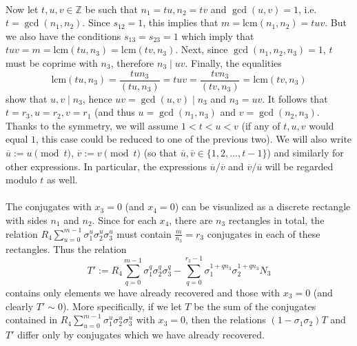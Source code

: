 \documentclass[12pt,a4paper]{article}
\newcommand{\Z}{\mathbb{Z}}
\newcommand{\uo}{\overline{u}}
\newcommand{\vo}{\overline{v}}
\newcommand{\lcm}{\mathrm{lcm}}
\begin{document}
\paragraph*{}
Now let $t,u,v\in\Z$ be such that $n_1=tu,n_2=tv$ and $\gcd(u,v)=1$, i.e. $t=\gcd(n_1,n_2)$. Since $s_{12}=1$, this implies that $m=\lcm(n_1,n_2)=tuv$. But we also have the conditions $s_{13}=s_{23}=1$ which imply that $tuv=m=\lcm(tu,n_3)=\lcm(tv,n_3)$. Next, since $\gcd(n_1,n_2,n_3)=1$, $t$ must be coprime with $n_3$, therefore $n_3\mid uv$. Finally, the equalities $$\lcm(tu,n_3)=\frac{tun_3}{(tu,n_3)}=tuv=\frac{tvn_3}{(tv,n_3)}=\lcm(tv,n_3)$$
show that $u,v\mid n_3$, hence $uv=\gcd(u,v)\mid n_3$ and $n_3=uv$. It follows that $t=r_3,u=r_2,v=r_1$ (and thus $u=\gcd(n_1,n_3)$ and $v=\gcd(n_2,n_3)$. Thanks to the symmetry, we will assume $1<t<u<v$ (if any of $t,u,v$ would equal $1$, this case could be reduced to one of the previous two). We will also write $\uo:=u\pmod{t}$, $\vo:=v\pmod{t}$ (so that $\uo,\vo\in\{1,2,\dots,t-1\}$) and similarly for other expressions. In particular, the expressions $\uo/\vo$ and $\vo/\uo$ will be regarded modulo $t$ as well.
\paragraph*{}
The conjugates with $x_3=0$ (and $x_4=0$) can be visualized as a discrete rectangle with sides $n_1$ and $n_2$. Since for each $x_4$, there are $n_3$ rectangles in total, the relation $R_4\sum_{u=0}^{m-1}\sigma_1^{u}\sigma_2^{u}\sigma_3^{u}$ must contain $\frac{m}{n_3}=r_3$ conjugates in each of these rectangles. Thus the relation $$T':=R_4\sum_{q=0}^{m-1}\sigma_1^{q}\sigma_2^{q}\sigma_3^{q}-\sum_{q=0}^{r_3-1} \sigma_1^{1+q n_3}\sigma_2^{1+q n_3}N_3 $$
contains only elements we have already recovered and those with $x_3=0$ (and clearly $T'\sim 0$). More specifically, if we let $T$ be the sum of the conjugates contained in  $R_4\sum_{u=0}^{m-1}\sigma_1^{u}\sigma_2^{u}\sigma_3^{u}$ with $x_3=0$, then the relations $(1-\sigma_1\sigma_2)T$ and $T'$ differ only by conjugates which we have already recovered.
\end{document}
